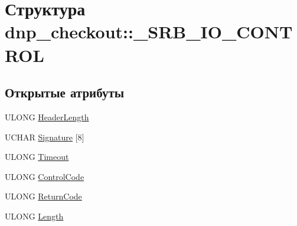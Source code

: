 \hypertarget{structdnp__checkout_1_1___s_r_b___i_o___c_o_n_t_r_o_l}{\section{Структура dnp\-\_\-checkout\-:\-:\-\_\-\-S\-R\-B\-\_\-\-I\-O\-\_\-\-C\-O\-N\-T\-R\-O\-L}
\label{structdnp__checkout_1_1___s_r_b___i_o___c_o_n_t_r_o_l}
}
\subsection*{Открытые атрибуты}
\begin{DoxyCompactItemize}
\item 
U\-L\-O\-N\-G \hyperlink{structdnp__checkout_1_1___s_r_b___i_o___c_o_n_t_r_o_l_a425891ae016e7761e283cb87a4e1dd04}{Header\-Length}
\item 
U\-C\-H\-A\-R \hyperlink{structdnp__checkout_1_1___s_r_b___i_o___c_o_n_t_r_o_l_ab20268b355c4216b3496d8a603ece077}{Signature} \mbox{[}8\mbox{]}
\item 
U\-L\-O\-N\-G \hyperlink{structdnp__checkout_1_1___s_r_b___i_o___c_o_n_t_r_o_l_a9f2367e5508f7001e0da9439580dbfd5}{Timeout}
\item 
U\-L\-O\-N\-G \hyperlink{structdnp__checkout_1_1___s_r_b___i_o___c_o_n_t_r_o_l_a4eba66ca654685ad1cd43ae247157d0e}{Control\-Code}
\item 
U\-L\-O\-N\-G \hyperlink{structdnp__checkout_1_1___s_r_b___i_o___c_o_n_t_r_o_l_a516339f7092eda246bf9a48342330f50}{Return\-Code}
\item 
U\-L\-O\-N\-G \hyperlink{structdnp__checkout_1_1___s_r_b___i_o___c_o_n_t_r_o_l_a19604bd52e959c15f32088462f3277d7}{Length}
\end{DoxyCompactItemize}



